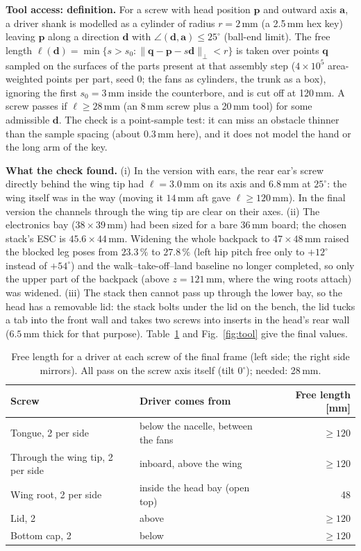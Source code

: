 \documentclass[11pt]{article}
\begin{document}
\textbf{Tool access: definition.} For a screw with head position $\mathbf p$ and outward axis $\mathbf a$, a driver
shank is modelled as a cylinder of radius $r=2$\,mm (a 2.5\,mm hex key) leaving $\mathbf p$ along a direction
$\mathbf d$ with $\angle(\mathbf d,\mathbf a)\le 25^\circ$ (ball-end limit). The free length
$\ell(\mathbf d)=\min\{s>s_0 : \|\mathbf q-\mathbf p-s\mathbf d\|_\perp<r\}$ is taken over points $\mathbf q$ sampled on the
surfaces of the parts present at that assembly step ($4\times10^5$ area-weighted points per part, seed 0; the fans as
cylinders, the trunk as a box), ignoring the first $s_0=3$\,mm inside the counterbore, and is cut off at 120\,mm. A screw
passes if $\ell\ge 28$\,mm (an 8\,mm screw plus a 20\,mm tool) for some admissible $\mathbf d$. The check is a
point-sample test: it can miss an obstacle thinner than the sample spacing (about 0.3\,mm here), and it does not
model the hand or the long arm of the key.

\textbf{What the check found.} (i) In the version with ears, the rear ear's screw directly behind the wing tip had
$\ell=3.0$\,mm on its axis and $6.8$\,mm at $25^\circ$: the wing itself was in the way (moving it $14$\,mm aft
gave $\ell\ge120$\,mm). In the final version the channels through the wing tip are clear on their axes. (ii) The
electronics bay ($38\times39$\,mm) had been sized for a bare 36\,mm board; the chosen stack's ESC is
$45.6\times44$\,mm. Widening the whole backpack to $47\times48$\,mm raised the blocked leg poses from $23.3\,\%$ to
$27.8\,\%$ (left hip pitch free only to $+12^\circ$ instead of $+54^\circ$) and the walk--take-off--land baseline
no longer completed, so only the upper part of the backpack (above $z=121$\,mm, where the wing roots attach) was
widened. (iii) The stack then cannot pass up through the lower bay, so the head has a removable lid: the stack bolts
under the lid on the bench, the lid tucks a tab into the front wall and takes two screws into inserts in the head's
rear wall ($6.5$\,mm thick for that purpose). Table~\ref{tab:tool} and Fig.~\ref{fig:tool} give the final values.

\begin{table}[h]\centering
\caption{Free length for a driver at each screw of the final frame (left side; the right side mirrors). All pass on
the screw axis itself (tilt $0^\circ$); needed: 28\,mm.}\label{tab:tool}
\begin{tabular}{llr}\toprule
Screw & Driver comes from & Free length [mm]\\\midrule
Tongue, 2 per side & below the nacelle, between the fans & $\ge 120$\\
Through the wing tip, 2 per side & inboard, above the wing & $\ge 120$\\
Wing root, 2 per side & inside the head bay (open top) & 48\\
Lid, 2 & above & $\ge 120$\\
Bottom cap, 2 & below & $\ge 120$\\\bottomrule
\end{tabular}\end{table}
\end{document}
